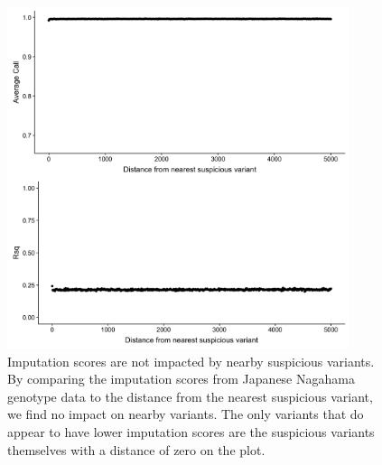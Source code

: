 \documentclass[9pt,article]{template}
\begin{document}
\begin{figure}[tbp]
\centering
\includegraphics[width=10cm,keepaspectratio]{../Figures/Imputation_Distance_100s_gw.jpg}
\caption{Imputation scores are not impacted by nearby suspicious variants. By comparing the imputation scores from Japanese Nagahama genotype data to the distance from the nearest suspicious variant, we find no impact on nearby variants. The only variants that do appear to have lower imputation scores are the suspicious variants themselves with a distance of zero on the plot. }  
\label{imputation_score}
\end{figure}
\end{document}
